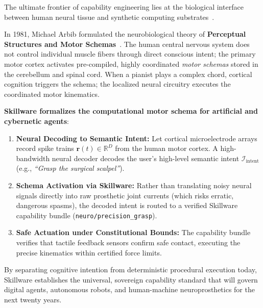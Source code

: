 The ultimate frontier of capability engineering lies at the biological interface between human neural tissue and synthetic computing substrates~\cite{musk2019integrated, willett2023speech, hochberg2006neuronal}.

In 1981, Michael Arbib formulated the neurobiological theory of \textbf{Perceptual Structures and Motor Schemas}~\cite{arbib1981perceptual}. The human central nervous system does not control individual muscle fibers through direct conscious intent; the primary motor cortex activates pre-compiled, highly coordinated \emph{motor schemas} stored in the cerebellum and spinal cord. When a pianist plays a complex chord, cortical cognition triggers the schema; the localized neural circuitry executes the coordinated motor kinematics.

\textbf{Skillware formalizes the computational motor schema for artificial and cybernetic agents}:
\begin{enumerate}[leftmargin=*]
  \item \textbf{Neural Decoding to Semantic Intent:} Let cortical microelectrode arrays record spike trains $\mathbf{r}(t) \in \mathbb{R}^D$ from the human motor cortex. A high-bandwidth neural decoder decodes the user's high-level semantic intent $\mathcal{I}_{\text{intent}}$ (e.g., \emph{``Grasp the surgical scalpel''}).
  \item \textbf{Schema Activation via Skillware:} Rather than translating noisy neural signals directly into raw prosthetic joint currents (which risks erratic, dangerous spasms), the decoded intent is routed to a verified Skillware capability bundle (\texttt{neuro/precision\_grasp}).
  \item \textbf{Safe Actuation under Constitutional Bounds:} The capability bundle verifies that tactile feedback sensors confirm safe contact, executing the precise kinematics within certified force limits.
\end{enumerate}

By separating cognitive intention from deterministic procedural execution today, Skillware establishes the universal, sovereign capability standard that will govern digital agents, autonomous robots, and human-machine neuroprosthetics for the next twenty years.
